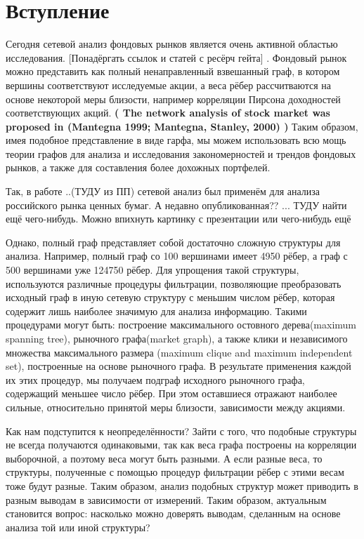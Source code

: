 \section{Вступление}

Сегодня сетевой анализ фондовых рынков является очень активной областью исследования. [Понадёргать ссылок и статей с ресёрч гейта] . Фондовый рынок можно представить как полный ненаправленный взвешанный граф, в котором вершины соответствуют исследуемые акции, а веса рёбер рассчитваются на основе некоторой меры близости, например корреляции Пирсона доходностей соответствующих акций. \textbf{( The network analysis of stock market was proposed in (Mantegna 1999; Mantegna, Stanley, 2000)  ) }Таким образом, имея подобное представление в виде гарфа, мы можем использовать всю мощь теории графов для анализа и исследования закономерностей и трендов фондовых рынков, а также для составления более дохожных портфелей.


 Так, в работе ..(ТУДУ из ПП) сетевой анализ был применём для анализа российского рынка ценных бумаг. А недавно опубликованная?? ... ТУДУ найти ещё чего-нибудь. Можно впихнуть картинку с презентации или чего-нибудь ещё
 
 
 

Однако, полный граф представляет собой достаточно сложную структуры для анализа. Например, полный граф со 100 вершинами имеет 4950 рёбер, а граф с 500 вершинами уже 124750 рёбер. Для упрощения такой структуры, используются различные процедуры фильтрации, позволяющие преобразовать исходный граф в иную сетевую структуру с меньшим числом рёбер, которая содержит лишь наиболее значимую для анализа информацию. Такими процедурами могут быть: построение максимального остовного дерева(maximum spanning tree), рыночного графа(market graph), а также клики и независимого множества максимального размера (maximum clique and maximum independent set), построенные на основе рыночного графа. В результате применения каждой их этих процедур, мы получаем подграф исходного рыночного графа, содержащий меньшее число рёбер. При этом оставшиеся отражают наиболее сильные, относительно принятой меры близости, зависимости между акциями.


Как нам подступится к неопределённости? Зайти с того, что подобные структуры не всегда получаются одинаковыми, так как веса графа построены на корреляции выборочной, а поэтому веса могут быть разными. А если разные веса, то структуры, полученные с помощью процедур фильтрации рёбер с этими весам тоже будут разные. Таким образом, анализ подобных структур может приводить в разным выводам в зависимости от измерений. Таким образом, актуальным становится вопрос: насколько можно доверять выводам, сделанным на основе анализа той или иной структуры? 

